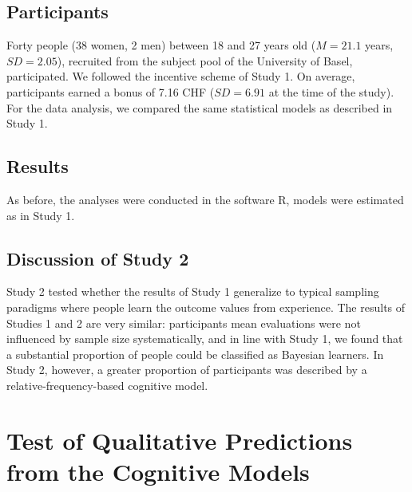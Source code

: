 \documentclass[a4paper, man, natbib, floatsintext]{apa6}
\begin{document}
\subsection{Participants}
Forty people (38 women, 2 men) between 18 and 27 years old ($M = 21.1$ years, $SD = 2.05$), recruited from the subject pool of the University of Basel, participated. We followed the incentive scheme of Study 1. On average, participants earned a bonus of 7.16 CHF ($SD = 6.91$ at the time of the study). For the data analysis, we compared the same statistical models as described in Study 1.

\subsection{Results}
As before, the analyses were conducted in the software R, models were estimated as in Study 1.


\clearpage

\subsection{Discussion of Study 2}
Study 2 tested whether the results of Study 1  generalize to typical sampling paradigms where people learn the outcome values from experience. The results of Studies 1 and 2 are very similar: participants mean evaluations were not influenced by sample size systematically, and in line with Study 1, we found that a substantial proportion of people could be classified as Bayesian learners. In Study 2, however, a greater proportion of participants was described by a  relative-frequency-based cognitive model.

\clearpage %

\section{Test of Qualitative Predictions from the Cognitive Models}
\end{document}
